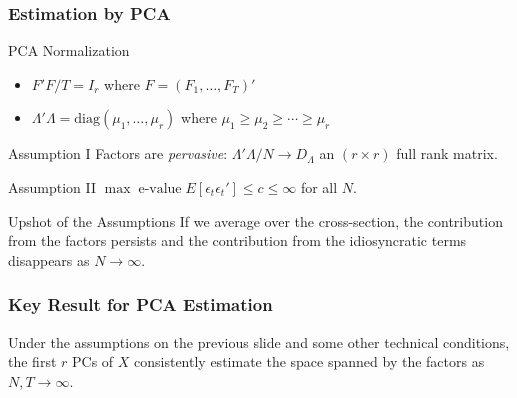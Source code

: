 \documentclass[handout]{beamer}
\begin{document}
\begin{frame}
\frametitle{Estimation by PCA}

\begin{block}
	{PCA Normalization}
		\begin{itemize}
			\item $F'F/T = I_r$ where $F = (F_1, \hdots, F_T)'$
			\item $\Lambda' \Lambda =\mbox{diag}(\mu_1, \hdots, \mu_r)$ where $\mu_1 \geq \mu_2 \geq \cdots \geq \mu_r$
		\end{itemize}
\end{block}
	
\begin{block}
	{Assumption I}
	Factors are \emph{pervasive}: $\Lambda' \Lambda/N \rightarrow D_\Lambda$ an $(r\times r)$ full rank matrix.
\end{block}

\begin{block}
	{Assumption II}
	$\max \;\mbox{e-value}\; E[\epsilon_t\epsilon_t']\leq c \leq \infty$ for all $N$.
\end{block}

\begin{block}
	{Upshot of the Assumptions}
If we average over the cross-section, the contribution from the factors persists and the contribution from the idiosyncratic terms disappears as $N\rightarrow \infty$.
\end{block}

\end{frame}
\begin{frame}
	\frametitle{Key Result for PCA Estimation}
	Under the assumptions on the previous slide and some other technical conditions, the first $r$ PCs of $X$ consistently estimate the space spanned by the factors as $N,T \rightarrow \infty$.
\end{frame}
\end{document}
